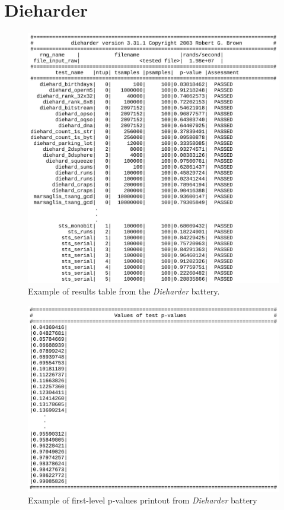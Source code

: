 \documentclass[
  digital,     %
  oneside,     %
  nosansbold,  %
  nocolorbold, %
  nolof,         %
  nolot,         %
]{fithesis4}
\begin{document}
\section{Dieharder}

\begin{figure}[h]
  \begin{center}
    \includegraphics[width=12.5cm]{figures/outputs-appendix/dieharder.jpg}
  \end{center}
  \caption{Example of results table from the \emph{Dieharder} battery.}
  \label{fig:die_out}
\end{figure}

\newpage

\begin{figure}[h]
  \begin{center}
    \includegraphics[width=12.5cm]{figures/outputs-appendix/pvals.jpg}
  \end{center}
  \caption{Example of first-level p-values printout from \emph{Dieharder} battery}
  \label{fig:die_pvals}
\end{figure}
\end{document}
